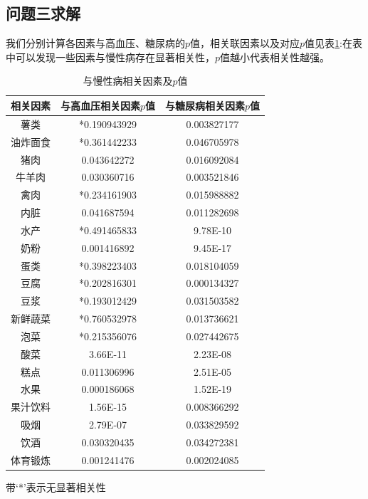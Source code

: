\documentclass{cumcmthesis}
\begin{document}
\subsection{问题三求解}
我们分别计算各因素与高血压、糖尿病的$p$值，相关联因素以及对应$p$值见表\ref{bbb}:在表中可以发现一些因素与慢性病存在显著相关性，$p$值越小代表相关性越强。
\begin{table}[H]
\centering
\caption{与慢性病相关因素及$p$值
}
\label{bbb}\begin{threeparttable}
\begin{tabular}{ccc}
\hline
相关因素    & 与高血压相关因素$p$值       & 与糖尿病相关因素$p$值 \\ \hline
薯类      & *0.190943929 & 0.003827177  \\
油炸面食    & *0.361442233 & 0.046705978  \\
猪肉      & 0.043642272        & 0.016092084  \\
牛羊肉     & 0.030360716        & 0.003521846  \\
禽肉      & *0.234161903 & 0.015988882  \\
内脏      & 0.041687594        & 0.011282698  \\
水产      & *0.491465833 & 9.78E-10     \\
奶粉      & 0.001416892        & 9.45E-17     \\
蛋类      & *0.398223403 & 0.018104059  \\
豆腐      & *0.202816301 & 0.000134327  \\
豆浆      & *0.193012429 & 0.031503582  \\
新鲜蔬菜    & *0.760532978 & 0.013736621  \\
泡菜      & *0.215356076  & 0.027442675  \\
酸菜      & 3.66E-11           & 2.23E-08     \\
糕点      & 0.011306996        & 2.51E-05     \\
水果      & 0.000186068        & 1.52E-19     \\
果汁饮料    & 1.56E-15           & 0.008366292  \\
吸烟      & 2.79E-07           & 0.033829592  \\
饮酒      & 0.030320435        & 0.034272381  \\
体育锻炼 & 0.001241476        & 0.002024085  \\ \hline
\end{tabular}
\begin{tablenotes}    %
        \footnotesize               %
        \item[1] 带`*'表示无显著相关性
      \end{tablenotes}            %
    \end{threeparttable}       %
\end{table}
\end{document}
